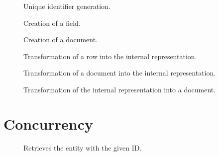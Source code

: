 \documentclass[12pt,letterpaper,oneside,notitlepage]{report}
\theoremstyle{definition}
\begin{document}
    \begin{figure}[ht!]
      \caption{Unique identifier generation.}
      \label{src:molly-datatypes-entity-uid}
    \end{figure}
    
    \begin{figure}[ht!]
      \caption{Creation of a field.}
      \label{src:molly-datatypes-entity-field}
    \end{figure}
    
    \begin{figure}[ht!]
      \caption{Creation of a document.}
      \label{src:molly-datatypes-entity-document}
    \end{figure}
    
    \begin{figure}[ht!]
      \caption{Transformation of a row into the internal representation.}
      \label{src:molly-datatypes-entity-row-data}
    \end{figure}
    
    \begin{figure}[ht!]
      \caption{Transformation of a document into the internal representation.}
      \label{src:molly-datatypes-entity-doc-data}
    \end{figure}
    
    \begin{figure}[ht!]
      \caption{Transformation of the internal representation into a document.}
      \label{src:molly-datatypes-entity-data-doc}
    \end{figure}
  
  \chapter{Concurrency}
    \begin{figure}[ht!]
      
      \caption{Retrieves the entity with the given ID.}
      \label{src:molly-algo-common-find-entity-by-id}
    \end{figure}
    
\end{document}
